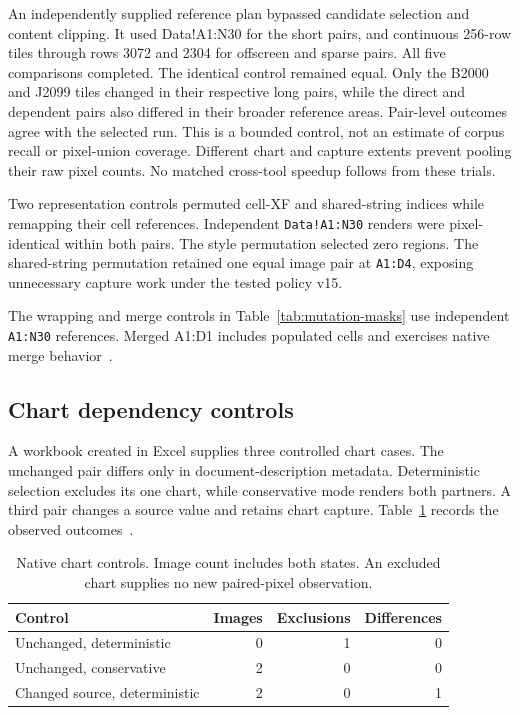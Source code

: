 An independently supplied reference plan bypassed candidate selection and content
clipping. It used Data!A1:N30 for the short pairs, and continuous 256-row tiles
through rows 3072 and 2304 for offscreen and sparse pairs. All five comparisons
completed. The identical control remained equal. Only the B2000 and J2099 tiles
changed in their respective long pairs, while the direct and dependent pairs
also differed in their broader reference areas. Pair-level outcomes agree with
the selected run. This is a bounded control, not an estimate of corpus recall
or pixel-union coverage. Different chart and capture extents prevent pooling
their raw pixel counts. No matched cross-tool speedup follows from these trials.

Two representation controls permuted cell-XF and shared-string indices while
remapping their cell references. Independent \texttt{Data!A1:N30} renders
were pixel-identical within both pairs. The style permutation selected zero
regions. The shared-string permutation retained one equal image pair at
\texttt{A1:D4}, exposing unnecessary capture work under the tested policy v15.

The wrapping and merge controls in Table~\ref{tab:mutation-masks} use independent
\texttt{A1:N30} references. Merged A1:D1 includes populated cells and exercises
native merge behavior~\cite{layoutcontrols}.

\subsection{Chart dependency controls}
A workbook created in Excel supplies three controlled chart cases. The unchanged
pair differs only in document-description metadata. Deterministic selection
excludes its one chart, while conservative mode renders both partners. A third
pair changes a source value and retains chart capture. Table~\ref{tab:chart-controls}
records the observed outcomes~\cite{chartdependencycontrols}.
\begin{table}[t]
\caption{Native chart controls. Image count includes both states. An excluded
chart supplies no new paired-pixel observation.}
\label{tab:chart-controls}
\centering\footnotesize
\begin{tabular}{lrrr}
\hline
Control & Images & Exclusions & Differences \\
\hline
Unchanged, deterministic & 0 & 1 & 0 \\
Unchanged, conservative & 2 & 0 & 0 \\
Changed source, deterministic & 2 & 0 & 1 \\
\hline
\end{tabular}
\end{table}

